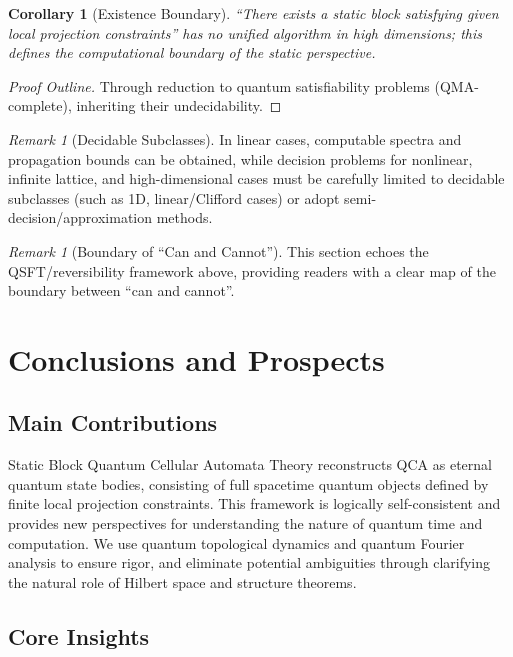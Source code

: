 \documentclass[11pt]{article}
\newtheorem{corollary}[theorem]{Corollary}
\theoremstyle{definition}
\theoremstyle{remark}
\newtheorem{remark}[theorem]{Remark}
\begin{document}
\begin{corollary}[Existence Boundary]\label{cor:qboundary}
``There exists a static block satisfying given local projection constraints'' has no unified algorithm in high dimensions; this defines the computational boundary of the static perspective.
\end{corollary}

\begin{proof}[Proof Outline]
Through reduction to quantum satisfiability problems (QMA-complete), inheriting their undecidability.
\end{proof}

\begin{remark}[Decidable Subclasses]
In linear cases, computable spectra and propagation bounds can be obtained, while decision problems for nonlinear, infinite lattice, and high-dimensional cases must be carefully limited to decidable subclasses (such as 1D, linear/Clifford cases) or adopt semi-decision/approximation methods.
\end{remark}

\begin{remark}[Boundary of ``Can and Cannot'']
This section echoes the QSFT/reversibility framework above, providing readers with a clear map of the boundary between ``can and cannot''.
\end{remark}

\section{Conclusions and Prospects}\label{sec:conclusions}

\subsection{Main Contributions}

Static Block Quantum Cellular Automata Theory reconstructs QCA as eternal quantum state bodies, consisting of full spacetime quantum objects defined by finite local projection constraints. This framework is logically self-consistent and provides new perspectives for understanding the nature of quantum time and computation. We use quantum topological dynamics and quantum Fourier analysis to ensure rigor, and eliminate potential ambiguities through clarifying the natural role of Hilbert space and structure theorems.

\subsection{Core Insights}
\end{document}
